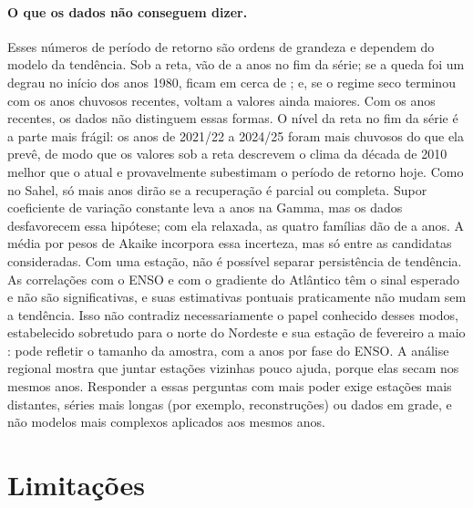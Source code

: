 \documentclass[11pt,a4paper]{article}
\begin{document}
\paragraph{O que os dados não conseguem dizer.} Esses números de período de retorno são ordens de
grandeza e dependem do modelo da tendência. Sob a reta, vão de \TNSFaixaMin{} a \TNSFaixaMax{} anos no
fim da série; se a queda foi um degrau no início dos anos 1980, ficam em cerca de \TFormaDegrau{}; e, se
o regime seco terminou com os anos chuvosos recentes, voltam a valores ainda maiores. Com os anos
recentes, os dados não distinguem essas formas. O nível da reta no fim da série é a parte mais frágil:
os anos de 2021/22 a 2024/25 foram mais chuvosos do que ela prevê, de modo que os valores sob a reta
descrevem o clima da década de 2010 melhor que o atual e provavelmente subestimam o período de retorno
hoje. Como no Sahel, só mais anos dirão se a recuperação é parcial ou completa. Supor coeficiente de
variação constante leva a \TNSGamma{} anos na Gamma, mas os dados desfavorecem essa hipótese; com ela
relaxada, as quatro famílias dão de \TNSVarMin{} a \TNSVarMax{} anos. A média por pesos de Akaike
incorpora essa incerteza, mas só entre as candidatas consideradas. Com uma estação, não é possível
separar persistência de tendência. As correlações com o ENSO e com o gradiente do Atlântico têm o sinal
esperado e não são significativas, e suas estimativas pontuais praticamente não mudam sem a tendência.
Isso não contradiz necessariamente o papel conhecido desses modos, estabelecido sobretudo para o norte
do Nordeste e sua estação de fevereiro a maio \parencite{hastenrath1977,moura1981}: pode refletir o
tamanho da amostra, com \NFaseNino{} a \NFaseNeutro{} anos por fase do ENSO. A análise regional mostra
que juntar estações vizinhas pouco ajuda, porque elas secam nos mesmos anos. Responder a essas
perguntas com mais poder exige estações mais distantes, séries mais longas (por exemplo,
reconstruções) ou dados em grade, e não modelos mais complexos aplicados aos mesmos anos.

\section{Limitações}\label{sec:limitacoes}
\end{document}
